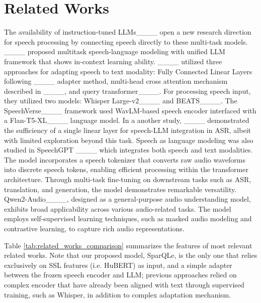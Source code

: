 \section{Related Works}
The availability  of instruction-tuned LLMs____ open a new research direction for speech processing by connecting speech directly to these multi-task models. ____ proposed multitask speech-language modeling with unified LLM framework that shows in-context learning ability. ____ utilized three approaches for adapting speech to text modality: Fully Connected Linear Layers following ____ adapter method, multi-head cross attention mechanism described in ____, and query transformer____. For processing speech input, they utilized two models: Whisper Large-v2____ and BEATS____. The SpeechVerse____ framework used WavLM-based speech encoder interfaced with a Flan-T5-XL____ language model.
In a another study, ____ demonstrated the sufficiency of a single linear layer for speech-LLM integration in ASR, albeit with limited exploration beyond this task.
Speech as language modeling was also studied in SpeechGPT ____ which integrates both speech and text modalities. The model incorporates a speech tokenizer that converts raw audio waveforms into discrete speech tokens, enabling efficient processing within the transformer architecture. Through multi-task fine-tuning on downstream tasks such as ASR, translation, and generation, the model demonstrates remarkable versatility. Qwen2-Audio____, designed as a general-purpose audio understanding model, exhibits broad applicability across various audio-related tasks. The model employs self-supervised learning techniques, such as masked audio modeling and contrastive learning, to capture rich audio representations.

Table \ref{tab:related_works_comparison} summarizes the features of most relevant related works. Note that our proposed model, SparQLe, is the only one that relies exclusively on SSL features (i.e. HuBERT) as input, and a simple adapter between the frozen speech encoder and LLM; previous approaches relied on complex encoder that have already been aligned with text through supervised training, such as Whisper, in addition to complex adaptation mechanism.